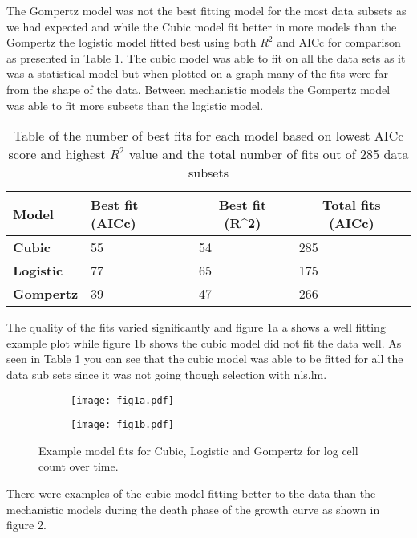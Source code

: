 \documentclass[11pt]{article}
\begin{document}
The Gompertz model was not the best fitting model for the most data subsets as we had expected and while the Cubic model fit better in more models than the Gompertz the logistic model fitted best using both $R^2$ and AICc for comparison as presented in Table 1. The cubic model was able to fit on all the data sets as it was a statistical model but when plotted on a graph many of the fits were far from the shape of the data. Between mechanistic models the Gompertz model was able to fit more subsets than the logistic model.
\begin{table}[hbt!]
\begin{center}

\caption{Table of the number of best fits for each model based on lowest AICc score and highest $R^2$ value and the total number of fits out of 285 data subsets}
    
\begin{tabular}{llll}
\textbf{Model}                         & \textbf{Best fit (AICc)} & \multicolumn{1}{c}{\textbf{Best fit (R^2)}} & \multicolumn{1}{c}{\textbf{Total fits (AICc)}} \\ \hline
\multicolumn{1}{l|}{\textbf{Cubic}}    & 55                       & 54                                                           & 285                                    \\
\multicolumn{1}{l|}{\textbf{Logistic}} & 77                       & 65                                                           & 175                                    \\
\multicolumn{1}{l|}{\textbf{Gompertz}} & 39                       & 47                                                           & 266                               
\end{tabular}
\end{center}   
\end{table}



The quality of the fits varied significantly and figure 1a a shows a well fitting example plot while figure 1b shows the cubic model did not fit the data well. As seen in Table 1 you can see that the cubic model was able to be fitted for all the data sub sets since it was not going though selection with nls.lm. 


\begin{figure}[hbt!]
\begin{subfigure}{.5\textwidth}
\texttt{[image: fig1a.pdf]}
\caption{}
\centering
\end{subfigure}%
\begin{subfigure}{.5\textwidth}
\texttt{[image: fig1b.pdf]}
\centering
\caption{}
\end{subfigure}%
\caption{Example model fits for Cubic, Logistic and Gompertz for log cell count over time.}
\end{figure}
\pagebreak
There were examples of the cubic model fitting better to the data than the mechanistic models during the death phase of the growth curve as shown in figure 2.
\end{document}

